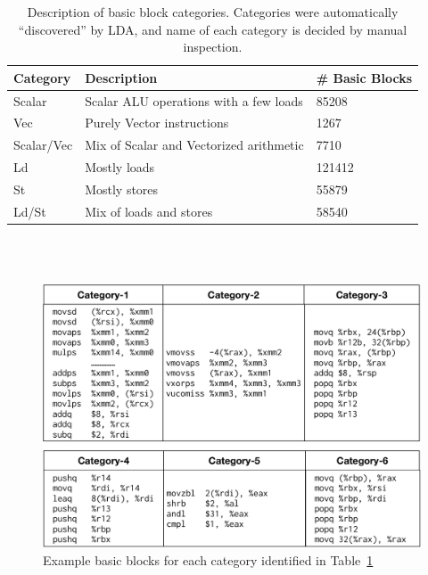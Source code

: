 \begin{table}
    \centering
\begin{tabular}{|p{}|p{}|p{}|} 
    \hline
    \textbf{Category} & \textbf{Description} & \textbf{\# Basic Blocks}\\
    \hline
    
    Scalar &
    Scalar ALU operations with a few loads & 85208 
    \\
    \hline
    
    Vec &
    Purely Vector instructions & 1267
    \\
    \hline
    
    Scalar/Vec & 
    Mix of Scalar and Vectorized arithmetic & 7710 
    \\
    \hline
    
    Ld &
    Mostly loads & 121412
    \\
    \hline
    
    St &
    Mostly stores & 55879 
    \\
    \hline
    
    Ld/St &
    Mix of loads and stores & 58540 
    \\
    \hline
    
\end{tabular}
\\
~\\
\caption{Description of basic block categories.  Categories were automatically ``discovered''
by LDA, and name of each category is decided by manual inspection.}
\label{tab:categories}

\end{table}

\begin{figure}[th]
\begin{center}
\includegraphics[width=\columnwidth]{figures/examples.pdf}
\caption{Example basic blocks for each category identified in Table~\ref{tab:categories}}
\label{fig:examples}
\end{center}
\end{figure}

